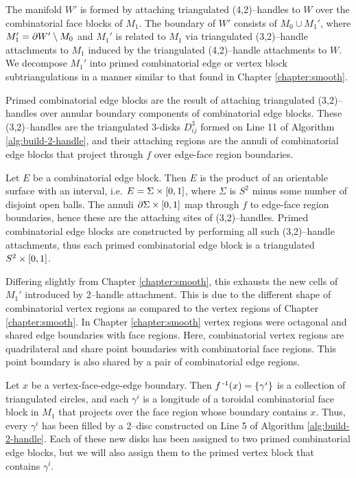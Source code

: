 The manifold $W'$ is formed by attaching triangulated (4,2)--handles to $W$ over the combinatorial face blocks of $M_1$.
The boundary of $W'$ consists of $M_0 \cup M_1'$, where $M_1'=\partial W'\setminus M_0$ and $M_1'$ is related to $M_1$ via triangulated (3,2)--handle attachments to $M_1$ induced by the triangulated (4,2)--handle attachments to $W$.
We decompose $M_1'$ into primed combinatorial edge or vertex block subtriangulations in a manner similar to that found in Chapter \ref{chapter:smooth}.

Primed combinatorial edge blocks are the result of attaching triangulated (3,2)--handles over annular boundary components of combinatorial edge blocks.
These (3,2)--handles are the triangulated 3-disks $D^3_{ij}$ formed on Line 11 of Algorithm \ref{alg:build-2-handle}, and their attaching regions are the annuli of combinatorial edge blocks that project through $f$ over edge-face region boundaries.

Let $E$ be a combinatorial edge block.
Then $E$ is the product of an orientable surface with an interval, i.e. $E=\Sigma\times[0,1]$, where $\Sigma$ is $S^2$ minus some number of disjoint open balls.
The annuli $\partial \Sigma\times[0,1]$ map through $f$ to edge-face region boundaries, hence these are the attaching sites of (3,2)--handles.
Primed combinatorial edge blocks are constructed by performing all such (3,2)--handle attachments, thus each primed combinatorial edge block is a triangulated $S^2\times[0,1]$.

Differing slightly from Chapter \ref{chapter:smooth}, this exhausts the new cells of $M_1'$ introduced by 2--handle attachment.
This is due to the different shape of combinatorial vertex regions as compared to the vertex regions of Chapter \ref{chapter:smooth}.
In Chapter \ref{chapter:smooth} vertex regions were octagonal and shared edge boundaries with face regions.
Here, combinatorial vertex regions are quadrilateral and share point boundaries with combinatorial face regions.
This point boundary is also shared by a pair of combinatorial edge regions.

Let $x$ be a vertex-face-edge-edge boundary.
Then $f^{\,\text{-}1}(x)=\{\gamma^i\}$ is a collection of triangulated circles, and each $\gamma^i$ is a longitude of a toroidal combinatorial face block in $M_1$ that projects over the face region whose boundary contains $x$.
Thus, every $\gamma^i$ has been filled by a 2--disc constructed on Line 5 of Algorithm \ref{alg:build-2-handle}.
Each of these new disks has been assigned to two primed combinatorial edge blocks, but we will also assign them to the primed vertex block that contains $\gamma^i$.

